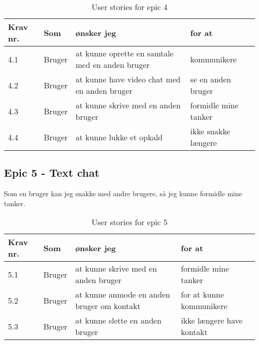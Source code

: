 \begin{table}[H]
    \centering
    \caption{User stories for epic 4}
    \label{tab:us-epic4}
    \begin{tabular}{p{1cm}|p{2cm}|p{6cm}|p{6cm}}
        \textbf{Krav nr.} & \textbf{Som} & \textbf{ønsker jeg}                             & \textbf{for at}      \\
        \hline
        4.1               & Bruger       & at kunne oprette en samtale med en anden bruger & kommunikere          \\
        \hline
        4.2               & Bruger       & at kunne have video chat med en anden bruger    & se en anden bruger   \\
        \hline
        4.3               & Bruger       & at kunne skrive med en anden bruger             & formidle mine tanker \\
        \hline
        4.4               & Bruger       & at kunne lukke et opkald                        & ikke snakke længere  \\
    \end{tabular}
\end{table}

\subsection{Epic 5 - Text chat}

Som en bruger kan jeg snakke med andre brugere, så jeg kunne formidle mine tanker.

\begin{table}[H]
    \centering
    \caption{User stories for epic 5}
    \label{tab:us-epic5}
    \begin{tabular}{p{1cm}|p{2cm}|p{6cm}|p{6cm}}
        \textbf{Krav nr.} & \textbf{Som} & \textbf{ønsker jeg}                        & \textbf{for at}           \\
        \hline
        5.1               & Bruger       & at kunne skrive med en anden bruger        & formidle mine tanker      \\
        \hline
        5.2               & Bruger       & at kunne anmode en anden bruger om kontakt & for at kunne kommunikere  \\
        \hline
        5.3               & Bruger       & at kunne slette en anden bruger            & ikke længere have kontakt \\
    \end{tabular}
\end{table}

